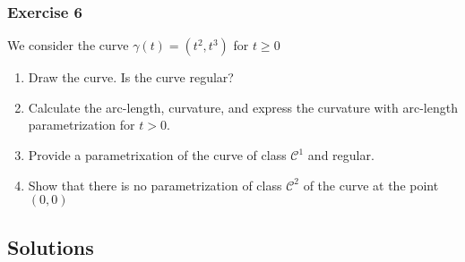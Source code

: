 \subsubsection{Exercise 6}
We consider the curve $ \gamma(t) = \left( t^2, t^3\right)   $ for $ t\geq 0 $
\begin{enumerate}
    \item Draw the curve. Is the curve regular? 
    \item Calculate the arc-length, curvature, and express the curvature with arc-length
        parametrization for $ t > 0 $. 
    \item Provide a parametrixation of the curve of class $ \mathscr{ C } ^1  $ and
        regular. 
    \item Show that there is no parametrization of class $ \mathscr{ C } ^2 $ of the curve
        at the point $ \left( 0,0\right)  $
\end{enumerate}
\subsection{Solutions}
\label{subsec:Solutions}

